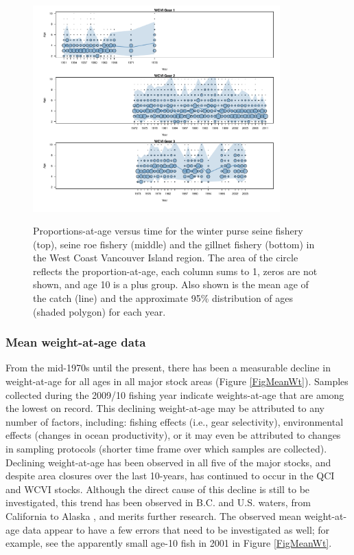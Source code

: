 \begin{figure}
	\centering
	\includegraphics[width=0.85\textwidth]{../Figs/iscam_fig_AgeCompsWCVI.pdf}\\
	\caption{Proportions-at-age versus time for the winter purse seine fishery (top), seine roe fishery (middle) and the gillnet fishery (bottom) in the West Coast Vancouver Island region.  The area of the circle reflects the proportion-at-age, each column sums to 1, zeros are not shown, and age 10 is a plus group. Also shown is the mean age of the catch (line) and the approximate 95\% distribution of ages (shaded polygon) for each year.}\label{FigAgeCompsWCVI}
\end{figure}





	\subsubsection{Mean weight-at-age data}

	From the mid-1970s until the present, there has been a measurable decline in weight-at-age for all ages in all major stock areas (Figure \ref{FigMeanWt}). Samples collected during the 2009/10 fishing year indicate weights-at-age that are among the lowest on record. This declining weight-at-age may be attributed to any number of factors, including: fishing effects (i.e., gear selectivity), environmental effects (changes in ocean productivity), or it may even be attributed to changes in sampling protocols (shorter time frame over which samples are collected). Declining weight-at-age has been observed in all five of the major stocks, and despite area closures over the last 10-years, has continued to occur in the QCI and WCVI stocks. Although the direct cause of this decline is still to be investigated, this trend has been observed in B.C. and U.S. waters, from California to Alaska \citep{schweigert2002herring}, and merits further research.	The observed mean weight-at-age data appear to have a few  errors that need to be investigated as well; for example, see the apparently small age-10 fish in 2001 in Figure \ref{FigMeanWt}.

